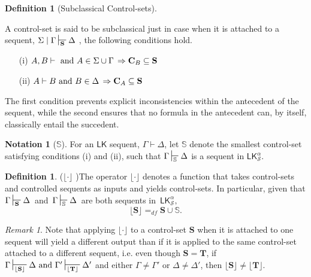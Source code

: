 \documentclass{article}                     %
\theoremstyle{theorem}
\theoremstyle{corollary}
\theoremstyle{lemma}
\theoremstyle{definition}
\newtheorem{definition}[section]{Definition}
\theoremstyle{remark}
\newtheorem{remark}{Remark}
\theoremstyle{definition}
\theoremstyle{notation}
\newtheorem{notation}{Notation}
\theoremstyle{definition}
\theoremstyle{proposition}
\theoremstyle{definition}
\begin{document}
\begin{definition}[Subclassical Control-sets] \label{Sc_Cs} 

A control-set is said to be subclassical just in case when it is attached to a sequent, $ \Sigma\mid\Gamma\sststile{\mathbf{S}}{} \Delta $ , the following conditions hold. 

\end{definition}

\begin{enumerate}
                    
                
\item[(i)] $ A, B  \vdash  \text{\,\,and\,\,} A \in \Sigma\cup\Gamma \,\Rightarrow \mathbf{C}_B \subseteq \mathbf{S} $ \\
 
\item[(ii)] $A \vdash B  \text{\,\,and\,\,} B \in \Delta\,\Rightarrow \mathbf{C}_A \subseteq \mathbf{S} $\\

\end{enumerate}
\vspace{-3mm}

The first condition prevents explicit inconsistencies within the antecedent of the sequent, while the second ensures that no formula in the antecedent can, by itself, classically entail the succedent. 


\begin{notation}[$\mathbb{S} $]
For an $ \mathsf{LK} $ sequent, $ \Gamma \vdash \Delta $, let $\mathbb{S}$ denote the smallest control-set satisfying conditions (i) and (ii), such that $ \Gamma\sststile{\mathbb{S}}{} \Delta $ is a sequent in $ \mathsf{LK}^\alpha_\mathcal{S} $.
\end{notation}

\begin{definition}($ \lfloor \cdot \rfloor $ )\label{Sc_Op}
The operator $ \lfloor \cdot \rfloor $ denotes a function that takes control-sets and controlled sequents as inputs and yields control-sets. In particular, given that $ \Gamma\sststile{\mathbf{S}}{} \Delta $ \,and\, $ \Gamma\sststile{\mathbb{S}}{} \Delta $\, are both sequents in \,$\mathsf{LK}^\alpha_\mathcal{S},\,$
$$ \lfloor\mathbf{S}\rfloor  =_{df} \mathbf{S} \cup \mathbb{S}. $$

\begin{remark}
Note that applying $ \lfloor \cdot \rfloor $ to a control-set $ \mathbf{S} $ when it is attached to one sequent will yield a different output than if it is applied to the same control-set  attached to a different sequent, i.e. even though $\mathbf{S} = \mathbf{T}$, if $\Gamma\sststile{\lfloor\mathbf{S}\rfloor}{} \Delta \,\,\text{and}\,\, \Gamma'\sststile{\lfloor\mathbf{T}\rfloor}{} \Delta'$ and either $\Gamma\neq \Gamma' $ or $\Delta\neq\Delta'$, then $\lfloor\mathbf{S}\rfloor \neq \lfloor\mathbf{T}\rfloor$.
\end{remark}

\end{definition}
\end{document}
